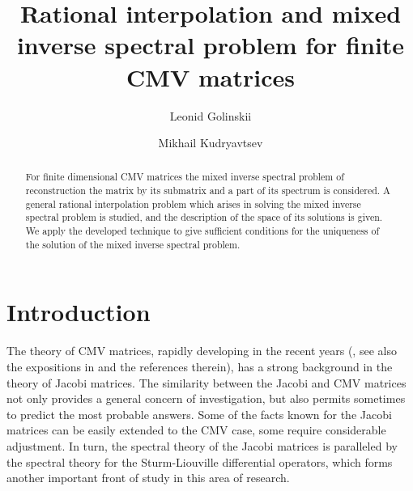 \documentclass{amsart}
\begin{document}
\title[Rational interpolation and mixed inverse problem]
{Rational interpolation and mixed inverse spectral problem for
finite CMV matrices}

\author{Leonid Golinskii}
\address{Institute for Low Temperature Physics and Engineering\\47\\ Lenin
ave.\\ Kharkov \\ Ukraine} 

\author{Mikhail Kudryavtsev}
\address{Institute for Low Temperature Physics and Engineering\\47\\ Lenin
ave.\\ Kharkov \\ Ukraine} 


\begin{abstract}
For finite dimensional CMV matrices the mixed inverse spectral
problem of reconstruction the matrix by its submatrix and a part
of its spectrum is considered. A general rational interpolation
problem which arises in solving the mixed inverse spectral problem
is studied, and the description of the space of its solutions is
given. We apply the developed technique to give sufficient
conditions for the uniqueness of the solution of the mixed inverse
spectral problem.
\end{abstract}

\maketitle

 \section{Introduction}\setcounter{section}{1}
\setcounter{equation}{0}

The theory of CMV matrices, rapidly developing in the recent years
(\cite{CMV2, CMV3, CMV4}, see also the expositions in \cite{sim2,
KN} and the references therein), has a strong background in the
theory of Jacobi matrices. The similarity between the Jacobi and
CMV matrices not only provides a general concern of investigation,
but also permits sometimes to predict the most probable answers.
Some of the facts known for the Jacobi matrices can be easily
extended to the CMV case, some require considerable adjustment. In
turn, the spectral theory of the Jacobi matrices is paralleled by
the spectral theory for the  Sturm-Liouville differential
operators, which forms another important front of study in this
area of research.
\end{document}

